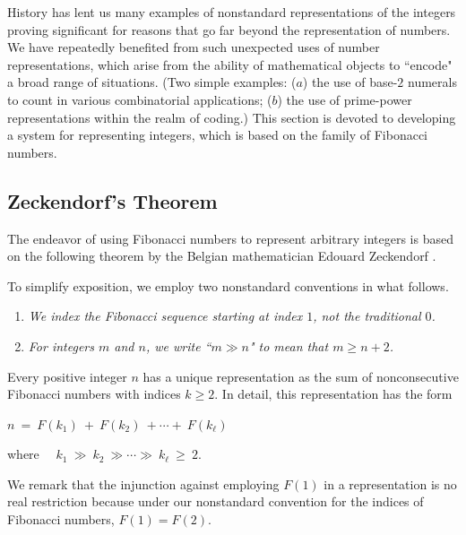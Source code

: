 History has lent us many examples of nonstandard representations of the integers proving significant for reasons that go far beyond the representation of numbers.  We have repeatedly benefited from such unexpected uses of number representations, which arise from the ability of mathematical objects to ``encode" a broad range of situations.  (Two simple examples: ($a$) the use of base-$2$ numerals to count in various combinatorial applications; ($b$) the use of prime-power representations within the realm of coding.)  This section is devoted to developing a system for representing integers, which is based on the family of Fibonacci numbers.

\subsection{Zeckendorf's Theorem}
\label{sec:Zeckendorf's-Theorem}


The endeavor of using Fibonacci numbers to represent arbitrary integers is based on the following theorem by the Belgian mathematician Edouard Zeckendorf \cite{Zeckendorf72}.

\smallskip

To simplify exposition, we employ two nonstandard conventions in what follows.
\begin{enumerate}
\item
{\em We index the Fibonacci sequence starting at index $1$, not the traditional $0$.}
\item
{\em For integers $m$ and $n$, we write ``$m \gg n$" to mean that $m \geq n+2$.}
\end{enumerate}

\begin{prop}
\label{thm:Zeckendorf}
Every positive integer $n$ has a unique representation as the sum of nonconsecutive Fibonacci numbers with indices $k \geq 2$.  In detail, this representation has the form

\smallskip

\hspace*{.25in} $n \ = \ F(k_1) \ + \ F(k_2) \ + \cdots + \ F(k_\ell)$

\smallskip

\noindent
where \ \ $k_1 \ \gg \ k_2 \ \gg \cdots \gg \ k_\ell \ \geq \ 2$.
\end{prop}

\medskip

We remark that the injunction against employing $F(1)$ in a representation is no real restriction because under our nonstandard convention for the indices of Fibonacci numbers, $F(1)=F(2)$.

